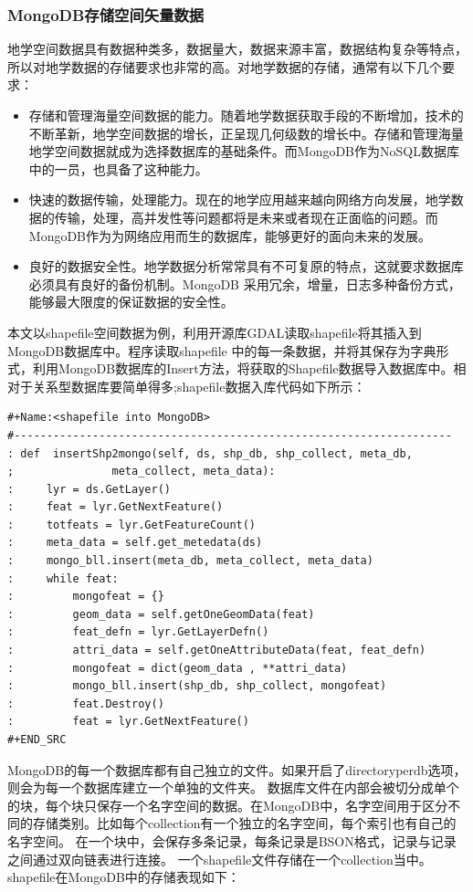 \documentclass[master]{njnuthesis}
\begin{document}
\subsubsection{MongoDB存储空间矢量数据}
地学空间数据具有数据种类多，数据量大，数据来源丰富，数据结构复杂等特点，所以对地学数据的存储要求也非常的高。对地学数据的存储，通常有以下几个要求：
\begin{itemize}
\item 存储和管理海量空间数据的能力。随着地学数据获取手段的不断增加，技术的不断革新，地学空间数据的增长，正呈现几何级数的增长中。存储和管理海量地学空间数据就成为选择数据库的基础条件。而MongoDB作为NoSQL数据库中的一员，也具备了这种能力。

\item 快速的数据传输，处理能力。现在的地学应用越来越向网络方向发展，地学数据的传输，处理，高并发性等问题都将是未来或者现在正面临的问题。而MongoDB作为为网络应用而生的数据库，能够更好的面向未来的发展。

\item 良好的数据安全性。地学数据分析常常具有不可复原的特点，这就要求数据库必须具有良好的备份机制。MongoDB 采用冗余，增量，日志多种备份方式，能够最大限度的保证数据的安全性。
\end{itemize}

  本文以shapefile空间数据为例，利用开源库GDAL读取shapefile将其插入到MongoDB数据库中。程序读取shapefile 中的每一条数据，并将其保存为字典形式，利用MongoDB数据库的Insert方法，将获取的Shapefile数据导入数据库中。相对于关系型数据库要简单得多;shapefile数据入库代码如下所示：
\begin{verbatim}
#+Name:<shapefile into MongoDB>
#-------------------------------------------------------------------
: def  insertShp2mongo(self, ds, shp_db, shp_collect, meta_db, 
;				meta_collect, meta_data):
:     lyr = ds.GetLayer()
:     feat = lyr.GetNextFeature()
:     totfeats = lyr.GetFeatureCount()
:     meta_data = self.get_metedata(ds)
:     mongo_bll.insert(meta_db, meta_collect, meta_data)
:     while feat:
:         mongofeat = {}
:         geom_data = self.getOneGeomData(feat)
:         feat_defn = lyr.GetLayerDefn()
:         attri_data = self.getOneAttributeData(feat, feat_defn)
:         mongofeat = dict(geom_data , **attri_data)
:         mongo_bll.insert(shp_db, shp_collect, mongofeat)
:         feat.Destroy()
:         feat = lyr.GetNextFeature()
#+END_SRC
\end{verbatim}

 MongoDB的每一个数据库都有自己独立的文件。如果开启了directoryperdb选项，则会为每一个数据库建立一个单独的文件夹。
  数据库文件在内部会被切分成单个的块，每个块只保存一个名字空间的数据。在MongoDB中，名字空间用于区分不同的存储类别。比如每个collection有一个独立的名字空间，每个索引也有自己的名字空间。
  在一个块中，会保存多条记录，每条记录是BSON格式，记录与记录之间通过双向链表进行连接。
  一个shapefile文件存储在一个collection当中。shapefile在MongoDB中的存储表现如下：
\end{document}
